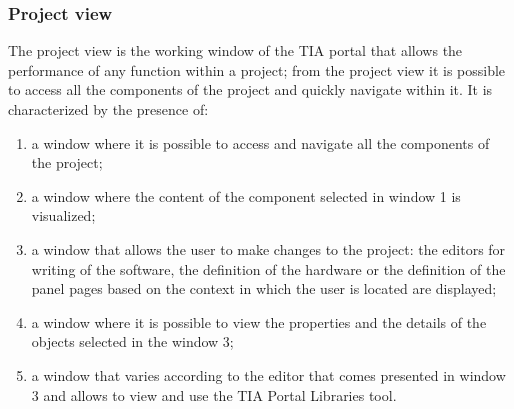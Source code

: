 \subsubsection{Project view}
The project view is the working window of the TIA portal that allows the performance of any function within a project; from the project view it is possible to access all the components of the project and quickly navigate within it.
It is characterized by the presence of:
\begin{enumerate}
    \item a window where it is possible to access and navigate all the components of the project;
    \item a window where the content of the component selected in window 1 is visualized;
    \item a window that allows the user to make changes to the project: the editors for writing of the software, the definition of the hardware or the definition of the panel pages based on the context in which the user is located are displayed;
    \item a window where it is possible to view the properties and the details of the objects selected in the window 3;
    \item a window that varies according to the editor that comes presented in window 3 and allows to view and use the TIA Portal Libraries tool.
\end{enumerate}





%

